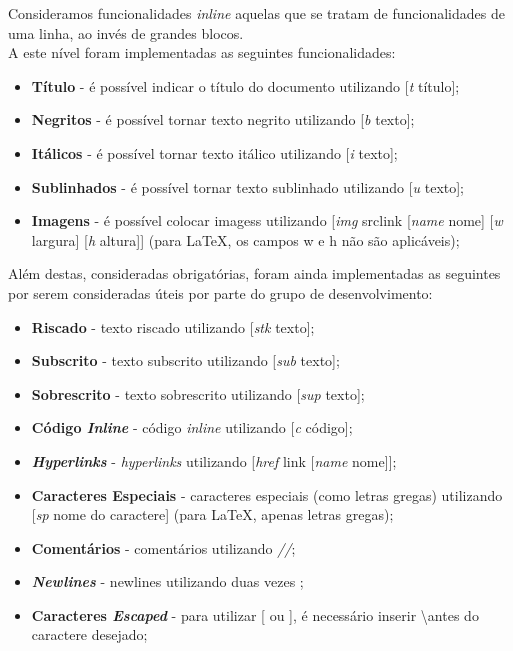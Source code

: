 \documentclass{article}
\begin{document}
Consideramos funcionalidades \textit{inline} aquelas que se tratam de funcionalidades de uma linha, ao invés de grandes blocos.\\
 A este nível foram implementadas as seguintes funcionalidades: 
\begin{itemize}
\item \textbf{Título} - é possível indicar o título do documento utilizando [\textit{t} título];
\item \textbf{Negritos} - é possível tornar texto negrito utilizando [\textit{b} texto];
\item \textbf{Itálicos} - é possível tornar texto itálico utilizando [\textit{i} texto];
\item \textbf{Sublinhados} - é possível tornar texto sublinhado utilizando [\textit{u} texto];
\item \textbf{Imagens} - é possível colocar imagess utilizando [\textit{img} srclink [\textit{name} nome] [\textit{w} largura] [\textit{h} altura]] (para LaTeX, os campos w e h não são aplicáveis);
\end{itemize}
 Além destas, consideradas obrigatórias, foram ainda implementadas as seguintes por serem consideradas úteis por parte do grupo de desenvolvimento: 
\begin{itemize}
\item \textbf{Riscado} - texto riscado utilizando [\textit{stk} texto];
\item \textbf{Subscrito} - texto subscrito utilizando [\textit{sub} texto];
\item \textbf{Sobrescrito} - texto sobrescrito utilizando [\textit{sup} texto];
\item \textbf{Código \textit{Inline}} - código \textit{inline} utilizando [\textit{c} código];
\item \textbf{\textit{Hyperlinks}} - \textit{hyperlinks} utilizando [\textit{href} link [\textit{name} nome]];
\item \textbf{Caracteres Especiais} - caracteres especiais (como letras gregas) utilizando [\textit{sp} nome do caractere] (para LaTeX, apenas letras gregas);
\item \textbf{Comentários} - comentários utilizando \textit{//};
\item \textbf{\textit{Newlines}} - newlines utilizando duas vezes \textbackslashn;
\item \textbf{Caracteres \textit{Escaped}} - para utilizar [ ou ], é necessário inserir \textbackslash antes do caractere desejado;
\end{itemize}
\end{document}
